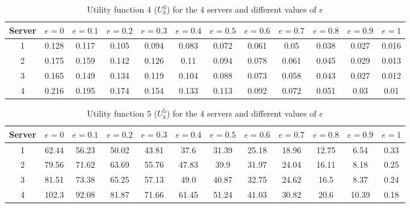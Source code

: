 \begin{table}[H]
    \caption{Utility function \(4\) (\(U_k^4\)) for the \(4\) servers and
    different values of \(e\)}
    \label{tab:case_study_utility_4_all_servers}
    \begin{adjustbox}{width=\columnwidth,center}
        \begin{tabular}{|c|c|c|c|c|c|c|c|c|c|c|c|}
            \hline
            Server & \(e = 0\) & \(e = 0.1\) & \(e = 0.2\) & \(e = 0.3\)
                   & \(e = 0.4\) & \(e = 0.5\) & \(e = 0.6\) & \(e = 0.7\)
                   & \(e = 0.8\) & \(e = 0.9\) & \(e = 1\) \\
            \hline
            1 & 0.128 & 0.117 & 0.105 & 0.094 & 0.083 & 0.072 & 0.061 & 0.05
            & 0.038 & 0.027 & 0.016 \\
            2 & 0.175 & 0.159 & 0.142 & 0.126 & 0.11 & 0.094 & 0.078 & 0.061
            & 0.045 & 0.029 & 0.013 \\
            3 & 0.165 & 0.149 & 0.134 & 0.119 & 0.104 & 0.088 & 0.073 & 0.058
            & 0.043 & 0.027 & 0.012 \\
            4 & 0.216 & 0.195 & 0.174 & 0.154 & 0.133 & 0.113 & 0.092 & 0.072
            & 0.051 & 0.03 & 0.01 \\            
            \hline
        \end{tabular}
    \end{adjustbox}
\end{table}

\begin{table}[H]
    \caption{Utility function \(5\) (\(U_k^5\)) for the \(4\) servers and
    different values of \(e\)}
    \label{tab:case_study_utility_5_all_servers}
    \begin{adjustbox}{width=\columnwidth,center}
        \begin{tabular}{|c|c|c|c|c|c|c|c|c|c|c|c|}
            \hline
            Server & \(e = 0\) & \(e = 0.1\) & \(e = 0.2\) & \(e = 0.3\)
                   & \(e = 0.4\) & \(e = 0.5\) & \(e = 0.6\) & \(e = 0.7\)
                   & \(e = 0.8\) & \(e = 0.9\) & \(e = 1\) \\
            \hline
            1 & 62.44 & 56.23 & 50.02 & 43.81 & 37.6 & 31.39 & 25.18 & 18.96 &
            12.75 & 6.54 & 0.33 \\
            2 & 79.56 & 71.62 & 63.69 & 55.76 & 47.83 & 39.9 & 31.97 & 24.04
            & 16.11 & 8.18 & 0.25 \\
            3 & 81.51 & 73.38 & 65.25 & 57.13 & 49.0 & 40.87 & 32.75 & 24.62
            & 16.5 & 8.37 & 0.24 \\
            4 & 102.3 & 92.08 & 81.87 & 71.66 & 61.45 & 51.24 & 41.03 & 30.82
            & 20.6 & 10.39 & 0.18 \\
            \hline
        \end{tabular}
    \end{adjustbox}
\end{table}

